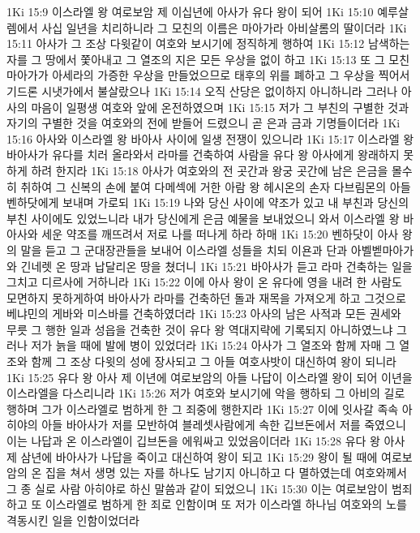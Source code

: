 1Ki 15:9  이스라엘 왕 여로보암 제 이십년에 아사가 유다 왕이 되어
1Ki 15:10  예루살렘에서 사십 일년을 치리하니라 그 모친의 이름은 마아가라 아비살롬의 딸이더라
1Ki 15:11  아사가 그 조상 다윗같이 여호와 보시기에 정직하게 행하여
1Ki 15:12  남색하는 자를 그 땅에서 쫓아내고 그 열조의 지은 모든 우상을 없이 하고
1Ki 15:13  또 그 모친 마아가가 아세라의 가증한 우상을 만들었으므로 태후의 위를 폐하고 그 우상을 찍어서 기드론 시냇가에서 불살랐으나
1Ki 15:14  오직 산당은 없이하지 아니하니라 그러나 아사의 마음이 일평생 여호와 앞에 온전하였으며
1Ki 15:15  저가 그 부친의 구별한 것과 자기의 구별한 것을 여호와의 전에 받들어 드렸으니 곧 은과 금과 기명들이더라
1Ki 15:16  아사와 이스라엘 왕 바아사 사이에 일생 전쟁이 있으니라
1Ki 15:17  이스라엘 왕 바아사가 유다를 치러 올라와서 라마를 건축하여 사람을 유다 왕 아사에게 왕래하지 못하게 하려 한지라
1Ki 15:18  아사가 여호와의 전 곳간과 왕궁 곳간에 남은 은금을 몰수히 취하여 그 신복의 손에 붙여 다메섹에 거한 아람 왕 헤시온의 손자 다브림몬의 아들 벤하닷에게 보내며 가로되
1Ki 15:19  나와 당신 사이에 약조가 있고 내 부친과 당신의 부친 사이에도 있었느니라 내가 당신에게 은금 예물을 보내었으니 와서 이스라엘 왕 바아사와 세운 약조를 깨뜨려서 저로 나를 떠나게 하라 하매
1Ki 15:20  벤하닷이 아사 왕의 말을 듣고 그 군대장관들을 보내어 이스라엘 성들을 치되 이욘과 단과 아벨벧마아가와 긴네렛 온 땅과 납달리온 땅을 쳤더니
1Ki 15:21  바아사가 듣고 라마 건축하는 일을 그치고 디르사에 거하니라
1Ki 15:22  이에 아사 왕이 온 유다에 영을 내려 한 사람도 모면하지 못하게하여 바아사가 라마를 건축하던 돌과 재목을 가져오게 하고 그것으로 베냐민의 게바와 미스바를 건축하였더라
1Ki 15:23  아사의 남은 사적과 모든 권세와 무릇 그 행한 일과 성읍을 건축한 것이 유다 왕 역대지략에 기록되지 아니하였느냐 그러나 저가 늙을 때에 발에 병이 있었더라
1Ki 15:24  아사가 그 열조와 함께 자매 그 열조와 함께 그 조상 다윗의 성에 장사되고 그 아들 여호사밧이 대신하여 왕이 되니라
1Ki 15:25  유다 왕 아사 제 이년에 여로보암의 아들 나답이 이스라엘 왕이 되어 이년을 이스라엘을 다스리니라
1Ki 15:26  저가 여호와 보시기에 악을 행하되 그 아비의 길로 행하며 그가 이스라엘로 범하게 한 그 죄중에 행한지라
1Ki 15:27  이에 잇사갈 족속 아히야의 아들 바아사가 저를 모반하여 블레셋사람에게 속한 깁브돈에서 저를 죽였으니 이는 나답과 온 이스라엘이 깁브돈을 에워싸고 있었음이더라
1Ki 15:28  유다 왕 아사 제 삼년에 바아사가 나답을 죽이고 대신하여 왕이 되고
1Ki 15:29  왕이 될 때에 여로보암의 온 집을 쳐서 생명 있는 자를 하나도 남기지 아니하고 다 멸하였는데 여호와께서 그 종 실로 사람 아히야로 하신 말씀과 같이 되었으니
1Ki 15:30  이는 여로보암이 범죄하고 또 이스라엘로 범하게 한 죄로 인함이며 또 저가 이스라엘 하나님 여호와의 노를 격동시킨 일을 인함이었더라

